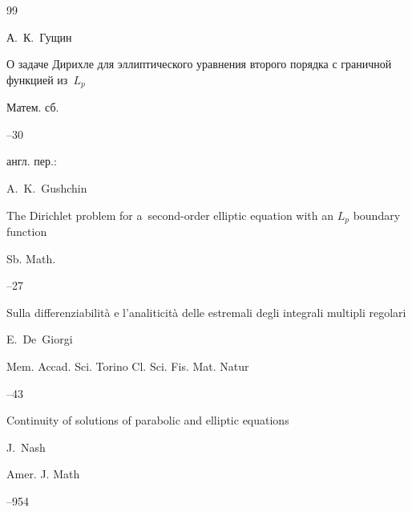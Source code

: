\begin{thebibliography}{99}

\by А.~К.~Гущин

\paper О задаче Дирихле для эллиптического уравнения второго порядка с граничной функцией из~$L_p$

\jour Матем. сб.




--30




\transl англ. пер.:~

\by A.~K.~Gushchin

\paper The Dirichlet problem for a~second-order elliptic equation with an $L_p$ boundary function

\jour Sb. Math.




--27







\paper Sulla differenziabilit\`a e l'analiticit\`a delle estremali degli integrali multipli regolari

\by E.~De~Giorgi

\jour Mem. Accad. Sci. Torino Cl. Sci. Fis. Mat. Natur




--43








\paper Continuity of solutions of parabolic and elliptic equations

\by J.~Nash

\jour Amer. J. Math




--954






\end{thebibliography}
